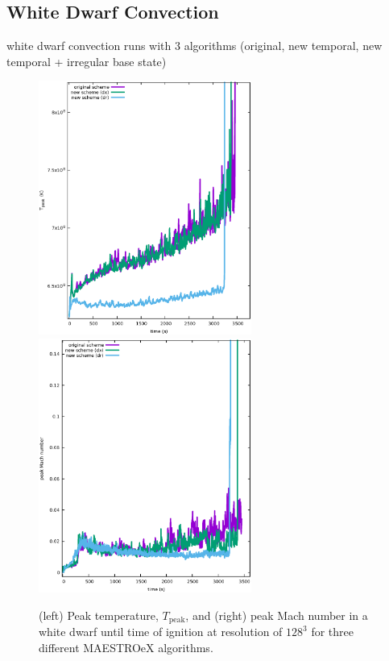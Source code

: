 \subsection{White Dwarf Convection}

white dwarf convection runs with 3 algorithms (original, new temporal, new temporal + irregular base state)

\begin{figure}[htb]
\begin{center}
\includegraphics[width=2.75in]{./figs/wdconvect_128_maxT} 
\includegraphics[width=2.75in]{./figs/wdconvect_128_maxMach}
\caption{\label{fig:wdconvect_128_maxval} (left) Peak temperature, $T_{\text{peak}}$, and (right) peak Mach number 
         in a white dwarf until time of ignition at resolution of $128^3$ for three different MAESTROeX algorithms.}
\end{center}
\end{figure}



